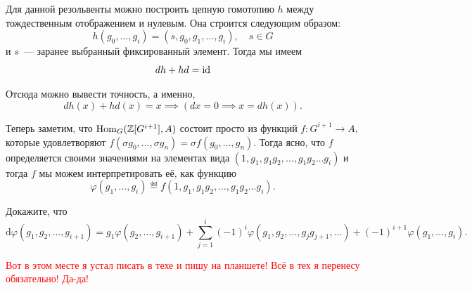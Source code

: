 	Для данной резольвенты можно построить цепную гомотопию $h$ между тождественным отображением и нулевым. Она строится следующим образом:
	\[
		h(g_0, \ldots, g_i) = (s, g_0, g_1, \ldots, g_{i}), \quad s \in G
	\]
	и $s$~--- заранее выбранный фиксированный элемент. Тогда мы имеем 
	\[
		dh + hd = \operatorname{id}
	\]

	Отсюда можно вывести точность, а именно, 
	\[
		dh(x) + hd(x) = x \implies (dx = 0 \implies x = dh(x)).
	\]

	Теперь заметим, что $\operatorname{Hom}_{G}(\mathbb{Z}[G^{i + 1}], A)$ состоит просто из функций $f\colon G^{i + 1} \to A$, которые удовлетворяют $f(\sigma g_0, \ldots, \sigma g_n) = \sigma f(g_0, \ldots, g_n)$. Тогда ясно, что $f$ определяется своими значениями на элементах вида $(1, g_1, g_1 g_2, \ldots, g_1 g_2 \ldots g_i)$ и тогда $f$ мы можем интерпретировать её, как функцию 
	\[
		\varphi(g_1, \ldots, g_i) \eqdef f(1, g_1, g_1 g_2, \ldots, g_1 g_2 \ldots g_i).
	\]

		\begin{exercise}
			Докажите, что 
			\[
				\mathrm{d}\varphi(g_1, g_2, \ldots, g_{i + 1}) = g_1 \varphi(g_2, \ldots, g_{i + 1}) + \sum_{j = 1}^{i}(-1)^i \varphi(g_1, g_2, \ldots, g_{j}g_{j + 1}, \ldots) + (-1)^{i + 1}\varphi(g_1, \ldots, g_i).
			\]
		\end{exercise}

	\textcolor{red}{Вот в этом месте я устал писать в техе и пишу на планшете! Всё в тех я перенесу обязательно! Да-да!}	




	

	





	

